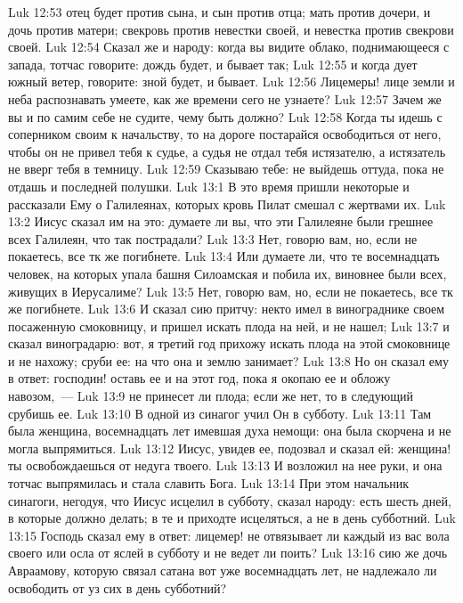 \vs Luk 12:53 отец будет против сына, и сын против отца; мать против дочери, и дочь против матери; свекровь против невестки своей, и невестка против свекрови своей.
\vs Luk 12:54 Сказал же и народу: когда вы видите облако, поднимающееся с запада, тотчас говорите: дождь будет, и бывает так;
\vs Luk 12:55 и когда дует южный ветер, говорите: зной будет, и бывает.
\vs Luk 12:56 Лицемеры! лице земли и неба распознавать умеете, как же времени сего не узнаете?
\vs Luk 12:57 Зачем же вы и по самим себе не судите, чему быть должно?
\vs Luk 12:58 Когда ты идешь с соперником своим к начальству, то на дороге постарайся освободиться от него, чтобы он не привел тебя к судье, а судья не отдал тебя истязателю, а истязатель не вверг тебя в темницу.
\vs Luk 12:59 Сказываю тебе: не выйдешь оттуда, пока не отдашь и последней полушки.
\vs Luk 13:1 В это время пришли некоторые и рассказали Ему о Галилеянах, которых кровь Пилат смешал с жертвами их.
\vs Luk 13:2 Иисус сказал им на это: думаете ли вы, что эти Галилеяне были грешнее всех Галилеян, что так пострадали?
\vs Luk 13:3 Нет, говорю вам, но, если не покаетесь, все тк же погибнете.
\vs Luk 13:4 Или думаете ли, что те восемнадцать человек, на которых упала башня Силоамская и побила их, виновнее были всех, живущих в Иерусалиме?
\vs Luk 13:5 Нет, говорю вам, но, если не покаетесь, все тк же погибнете.
\vs Luk 13:6 И сказал сию притчу: некто имел в винограднике своем посаженную смоковницу, и пришел искать плода на ней, и не нашел;
\vs Luk 13:7 и сказал виноградарю: вот, я третий год прихожу искать плода на этой смоковнице и не нахожу; сруби ее: на что она и землю занимает?
\vs Luk 13:8 Но он сказал ему в ответ: господин! оставь ее и на этот год, пока я окопаю ее и обложу навозом,~---
\vs Luk 13:9 не принесет ли плода; если же нет, то в следующий  срубишь ее.
\rsbpar\vs Luk 13:10 В одной из синагог учил Он в субботу.
\vs Luk 13:11 Там была женщина, восемнадцать лет имевшая духа немощи: она была скорчена и не могла выпрямиться.
\vs Luk 13:12 Иисус, увидев ее, подозвал и сказал ей: женщина! ты освобождаешься от недуга твоего.
\vs Luk 13:13 И возложил на нее руки, и она тотчас выпрямилась и стала славить Бога.
\vs Luk 13:14 При этом начальник синагоги, негодуя, что Иисус исцелил в субботу, сказал народу: есть шесть дней, в которые должно делать; в те и приходте исцеляться, а не в день субботний.
\vs Luk 13:15 Господь сказал ему в ответ: лицемер! не отвязывает ли каждый из вас вола своего или осла от яслей в субботу и не ведет ли поить?
\vs Luk 13:16 сию же дочь Авраамову, которую связал сатана вот уже восемнадцать лет, не надлежало ли освободить от уз сих в день субботний?
